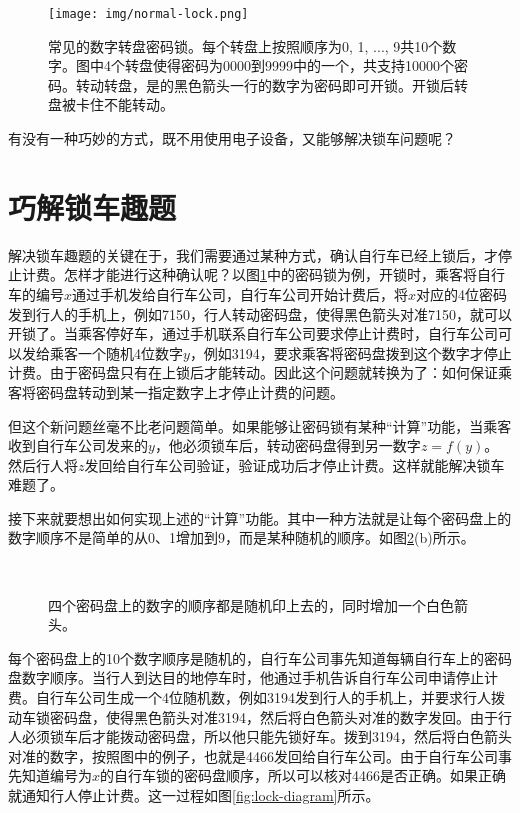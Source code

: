 \documentclass[UTF8]{article}
\begin{document}
\begin{figure}[htbp]
  \centering
  \texttt{[image: img/normal-lock.png]}
  \caption{常见的数字转盘密码锁。每个转盘上按照顺序为0, 1, ..., 9共10个数字。图中4个转盘使得密码为0000到9999中的一个，共支持10000个密码。转动转盘，是的黑色箭头一行的数字为密码即可开锁。开锁后转盘被卡住不能转动。}
  \label{fig:normal-lock}
\end{figure}


有没有一种巧妙的方式，既不用使用电子设备，又能够解决锁车问题呢？

\section{巧解锁车趣题}

解决锁车趣题的关键在于，我们需要通过某种方式，确认自行车已经上锁后，才停止计费。怎样才能进行这种确认呢？以图\ref{fig:normal-lock}中的密码锁为例，开锁时，乘客将自行车的编号$x$通过手机发给自行车公司，自行车公司开始计费后，将$x$对应的4位密码发到行人的手机上，例如7150，行人转动密码盘，使得黑色箭头对准7150，就可以开锁了。当乘客停好车，通过手机联系自行车公司要求停止计费时，自行车公司可以发给乘客一个随机4位数字$y$，例如3194，要求乘客将密码盘拨到这个数字才停止计费。由于密码盘只有在上锁后才能转动。因此这个问题就转换为了：如何保证乘客将密码盘转动到某一指定数字上才停止计费的问题。

但这个新问题丝毫不比老问题简单。如果能够让密码锁有某种“计算”功能，当乘客收到自行车公司发来的$y$，他必须锁车后，转动密码盘得到另一数字$z=f(y)$。然后行人将$z$发回给自行车公司验证，验证成功后才停止计费。这样就能解决锁车难题了。

接下来就要想出如何实现上述的“计算”功能。其中一种方法就是让每个密码盘上的数字顺序不是简单的从0、1增加到9，而是某种随机的顺序。如图\ref{fig:random-lock}(b)所示。

\begin{figure}[htbp]
  \centering
   \\
  \caption{四个密码盘上的数字的顺序都是随机印上去的，同时增加一个白色箭头。}
  \label{fig:random-lock}
\end{figure}

每个密码盘上的10个数字顺序是随机的，自行车公司事先知道每辆自行车上的密码盘数字顺序。当行人到达目的地停车时，他通过手机告诉自行车公司申请停止计费。自行车公司生成一个4位随机数，例如3194发到行人的手机上，并要求行人拨动车锁密码盘，使得黑色箭头对准3194，然后将白色箭头对准的数字发回。由于行人必须锁车后才能拨动密码盘，所以他只能先锁好车。拨到3194，然后将白色箭头对准的数字，按照图中的例子，也就是4466发回给自行车公司。由于自行车公司事先知道编号为$x$的自行车锁的密码盘顺序，所以可以核对4466是否正确。如果正确就通知行人停止计费。这一过程如图\ref{fig:lock-diagram}所示。
\end{document}
